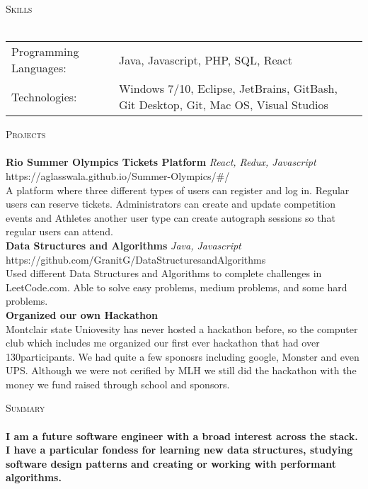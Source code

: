 \documentclass[a4paper]{article}
\newcommand{\lineunder} {
    \vspace*{-8pt} \\
    \hspace*{-18pt} \hrulefill \\
}
\newcommand{\header} [1] {
    {\hspace*{-18pt}\vspace*{6pt} \textsc{#1}}
    \vspace*{-6pt} \lineunder
}
\begin{document}
\header{Skills}
\begin{tabular}{ l l }
	Programming Languages: & Java, Javascript, PHP, SQL, React                                                   \\
	Technologies:          & Windows 7/10, Eclipse, JetBrains, GitBash, Git Desktop, Git, Mac OS, Visual Studios \\
\end{tabular}
\vspace{2mm}

\header{Projects}
{\textbf{Rio Summer Olympics Tickets Platform}} {\sl React, Redux, Javascript} \hfill https://aglasswala.github.io/Summer-Olympics/\#/\\
A platform where three different types of users can register and log in. Regular users can reserve tickets. Administrators can create and update competition events and Athletes another user type can create autograph sessions so that regular users can attend.\\
\vspace*{2mm}
{\textbf{Data Structures and Algorithms}} {\sl Java, Javascript} \hfill https://github.com/GranitG/DataStructuresandAlgorithms\\
Used different Data Structures and Algorithms to complete challenges in LeetCode.com. Able to solve easy problems, medium problems, and some hard problems.\\
\vspace*{2mm}
{\textbf{Organized our own Hackathon}}\\
Montclair state Uniovesity has never hosted a hackathon before, so the computer club which includes me organized our first ever hackathon that had over 130participants. We had quite a few sponosrs including google, Monster and even UPS. Although we were not cerified by MLH we still did the hackathon with the money we fund raised through school and sponsors.\\
\vspace*{2mm}

\header{Summary}
\textbf{I am a future software engineer with a broad interest across the stack. I have a particular fondess for learning new data structures, studying software design patterns and creating or working with performant algorithms.}\\

\vspace*{2mm}

\ 
\end{document}
